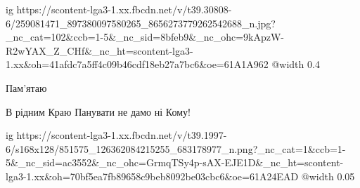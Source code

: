  
 
 
 
 

\ifcmt
  ig https://scontent-lga3-1.xx.fbcdn.net/v/t39.30808-6/259081471_897380097580265_8656273779262542688_n.jpg?_nc_cat=102&ccb=1-5&_nc_sid=8bfeb9&_nc_ohc=9kApzW-R2wYAX_Z_CHf&_nc_ht=scontent-lga3-1.xx&oh=41afdc7a5ff4c09b46cdf18eb27a7bc6&oe=61A1A962
  @width 0.4
\fi

Пам'ятаю

В рідним Краю Панувати не дамо ні Кому!


\ifcmt
  ig https://scontent-lga3-1.xx.fbcdn.net/v/t39.1997-6/s168x128/851575_126362084215255_683178977_n.png?_nc_cat=1&ccb=1-5&_nc_sid=ac3552&_nc_ohc=GrmqTSy4p-sAX-EJE1D&_nc_ht=scontent-lga3-1.xx&oh=70bf5ea7fb89658c9beb8092be03cbc6&oe=61A24EAD
  @width 0.05
\fi
